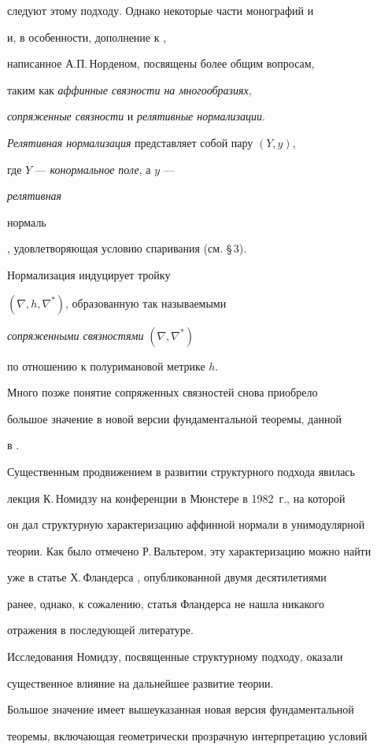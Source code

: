 следуют этому подходу. Однако некоторые части монографий \cite{SALK} и


\cite{SCHI} и, в особенности, дополнение к \cite{SCHI},


написанное А.П.\,Норденом, посвящены более общим вопросам,


таким как {\it аффинные связности на многообразиях},


{\it сопряженные связности} и {\it релятивные нормализации}.


{\it Релятивная нормализация} представляет собой пару $(Y,y)$,


где $Y$ --- {\it конормальное поле}, а $y$ --- {\it релятивная


нормаль}, удовлетворяющая условию спаривания (см. \S\,3).


Нормализация индуцирует тройку


$(\nabla, h, \nabla^*)$, образованную так называемыми


{\it сопряженными связностями} $(\nabla,\nabla^*)$


по отношению к полуримановой метрике $h$.


Много позже понятие сопряженных связностей снова приобрело


большое значение в новой версии фундаментальной теоремы, данной


в \cite{DIL-N-V}.





Существенным продвижением в развитии структурного подхода явилась


лекция К.\,Номидзу на конференции в Мюнстере в 1982~г., на которой


он дал структурную характеризацию аффинной нормали в унимодулярной


теории. Как было отмечено Р.\,Вальтером, эту характеризацию можно найти 


уже в статье Х.\,Фландерса \cite{FLA}, опубликованной двумя десятилетиями


ранее, однако, к сожалению, статья Фландерса не нашла никакого


отражения в последующей литературе.


Исследования Номидзу, посвященные структурному подходу, оказали


существенное влияние на дальнейшее развитие теории.


Большое значение имеет вышеуказанная новая версия фундаментальной


теоремы, включающая геометрически прозрачную интерпретацию условий


